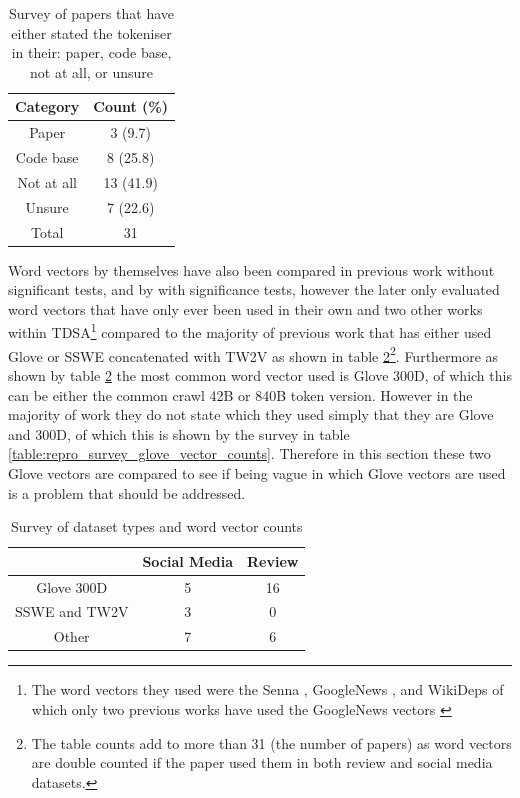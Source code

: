 \begin{table}[h!]
    \centering
    \begin{tabular}{|c|c|}
        \hline
        Category & Count (\%) \\
        \hline
        Paper & 3 (9.7)\\
        \hline 
        Code base & 8 (25.8)\\
        \hline 
        Not at all & 13 (41.9)\\
        \hline 
        Unsure & 7 (22.6)\\
        \hline
        Total & 31\\
        \hline
    \end{tabular}
    \caption{Survey of papers that have either stated the tokeniser in their: paper, code base, not at all, or unsure}
    \label{table:repro_tokeniser_survey}
\end{table}

Word vectors by themselves have also been compared in previous work \citep{repro_vo_2015,repro_tang_2016} without significant tests, and by \citet{repro_marrese_2017} with significance tests, however the later only evaluated word vectors that have only ever been used in their own and two other works within TDSA\footnote{The word vectors they used were the Senna \citep{repro_collobert_2011}, GoogleNews \citep{repro_mikolov_2013_dist}, and WikiDeps \citep{repro_levy_2014} of which only two previous works have used the GoogleNews vectors \citep{repro_nguyen_2015,repro_wang_2018}} compared to the majority of previous work that has either used Glove \citep{repro_pennington_2014} or SSWE concatenated with TW2V as shown in table \ref{table:repro_survey_word_vector_counts}\footnote{The table counts add to more than 31 (the number of papers) as word vectors are double counted if the paper used them in both review and social media datasets.}. Furthermore as shown by table \ref{table:repro_survey_word_vector_counts} the most common word vector used is Glove 300D, of which this can be either the common crawl 42B or 840B token version. However in the majority of work they do not state which they used simply that they are Glove and 300D, of which this is shown by the survey in table \ref{table:repro_survey_glove_vector_counts}. Therefore in this section these two Glove vectors are compared to see if being vague in which Glove vectors are used is a problem that should be addressed.

\begin{table}[h!]
    \centering
    \begin{tabular}{|c|c|c|}
        \hline
         & Social Media & Review  \\
        \hline 
        Glove 300D & 5 & 16 \\
        \hline 
        SSWE and TW2V & 3 & 0 \\
        \hline 
        Other & 7 & 6 \\
        \hline
    \end{tabular}
    \caption{Survey of dataset types and word vector counts}
    \label{table:repro_survey_word_vector_counts}
\end{table}

